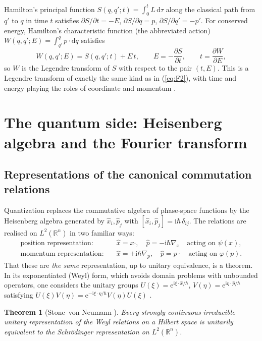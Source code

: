 \documentclass[11pt,a4paper]{article}
\newcommand{\R}{\mathbb{R}}
\newcommand{\ii}{\mathrm{i}}
\newcommand{\dd}{\mathrm{d}}
\newcommand{\ee}{\mathrm{e}}
\newcommand{\hb}{\hbar}
\newcommand{\op}[1]{\hat{#1}}
\theoremstyle{plain}
\newtheorem{theorem}{Theorem}[section]
\theoremstyle{definition}
\theoremstyle{remark}
\begin{document}
Hamilton's principal function $S(q,q';t)=\int_0^t L\,\dd\tau$ along the classical path from $q'$ to $q$ in time $t$ satisfies $\partial S/\partial t=-E$, $\partial S/\partial q=p$, $\partial S/\partial q'=-p'$. For conserved energy, Hamilton's characteristic function (the abbreviated action) $W(q,q';E)=\int_{q'}^{q}p\cdot\dd q$ satisfies
\begin{equation}\label{eq:WLegendre}
W(q,q';E)=S(q,q';t)+E\,t,\qquad E=-\frac{\partial S}{\partial t},\qquad t=\frac{\partial W}{\partial E},
\end{equation}
so $W$ is the Legendre transform of $S$ with respect to the pair $(t,E)$. This is a Legendre transform of exactly the same kind as in (\ref{eq:F2}), with time and energy playing the roles of coordinate and momentum \cite{LL1,Gutzwiller}.


\section{The quantum side: Heisenberg algebra and the Fourier transform}

\subsection{Representations of the canonical commutation relations}

Quantization replaces the commutative algebra of phase-space functions by the Heisenberg algebra generated by $\op x_i,\op p_j$ with $[\op x_i,\op p_j]=\ii\hb\,\delta_{ij}$. The relations are realised on $L^2(\R^n)$ in two familiar ways:
\begin{align}
\text{position representation:}&\quad \op x=x\cdot,\quad \op p=-\ii\hb\nabla_x \quad\text{acting on }\psi(x),\\
\text{momentum representation:}&\quad \op x=+\ii\hb\nabla_p,\quad \op p=p\cdot\quad\text{acting on }\varphi(p).
\end{align}
That these are \emph{the same} representation, up to unitary equivalence, is a theorem. In its exponentiated (Weyl) form, which avoids domain problems with unbounded operators, one considers the unitary groups $U(\xi)=\ee^{\ii\xi\cdot\op x/\hb}$, $V(\eta)=\ee^{\ii\eta\cdot\op p/\hb}$ satisfying $U(\xi)V(\eta)=\ee^{-\ii\xi\cdot\eta/\hb}V(\eta)U(\xi)$ \cite{Hall,Folland}.

\begin{theorem}[Stone--von Neumann \cite{Stone,vonNeumann}]\label{thm:SvN}
Every strongly continuous irreducible unitary representation of the Weyl relations on a Hilbert space is unitarily equivalent to the Schr\"odinger representation on $L^2(\R^n)$.
\end{theorem}
\end{document}
